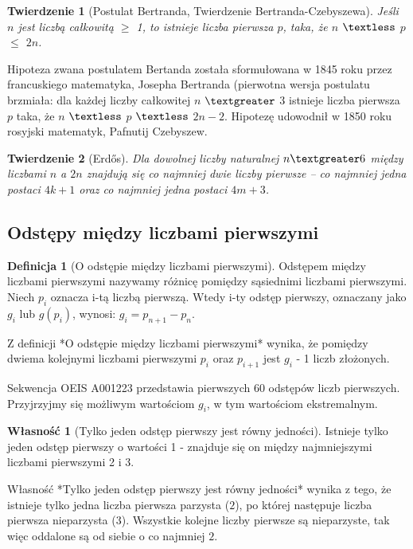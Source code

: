 \documentclass[10pt,onecolumn]{article}
\newtheorem{theorem}{Twierdzenie}
\theoremstyle{definition}
\newtheorem{definition}{Definicja}
\theoremstyle{hypothesis}
\theoremstyle{capability}
\newtheorem{capability}{Własność}
\begin{document}
\begin{theorem}[Postulat Bertranda, Twierdzenie Bertranda-Czebyszewa]
Jeśli $n$ jest liczbą całkowitą $\geq$ 1, to istnieje liczba pierwsza $p$, taka, że $n$ $\textless$ $p$ $\leq$ $2n$.
\end{theorem}

Hipoteza zwana postulatem Bertanda została sformułowana w 1845 roku przez francuskiego matematyka, Josepha Bertranda (pierwotna wersja postulatu brzmiała:  dla każdej liczby całkowitej $n$ $\textgreater$ $3$ istnieje liczba pierwsza $p$ taka, że $n$ $\textless$ $p$ $\textless$ $2n-2$. Hipotezę udowodnił w 1850 roku rosyjski matematyk, Pafnutij Czebyszew.

\begin{theorem}[Erdős]
Dla dowolnej liczby naturalnej $n \textgreater 6$  między liczbami $n$ a $2n$ znajdują się co najmniej dwie liczby pierwsze – co najmniej jedna postaci $4k+1$ oraz co najmniej jedna postaci $4m+3$. 
\end{theorem}

\subsection{Odstępy między liczbami pierwszymi}

\begin{definition} [O odstępie między liczbami pierwszymi]
Odstępem między liczbami pierwszymi nazywamy różnicę pomiędzy sąsiednimi liczbami pierwszymi. Niech $p_i$ oznacza i-tą liczbą pierwszą. Wtedy i-ty odstęp pierwszy, oznaczany jako $g_i$ lub $g(p_i)$, wynosi: $g_i = p_{n+1} - p_n$.
\end{definition}

Z definicji *O odstępie między liczbami pierwszymi* wynika, że pomiędzy dwiema kolejnymi liczbami pierwszymi $p_i$ oraz $p_{i+1}$ jest $g_i$ - 1 liczb złożonych. \par

Sekwencja OEIS A001223 przedstawia pierwszych 60 odstępów liczb pierwszych. Przyjrzyjmy się możliwym wartościom $g_i$, w tym wartościom ekstremalnym.

\begin{capability}[Tylko jeden odstęp pierwszy jest równy jedności]
Istnieje tylko jeden odstęp pierwszy o wartości 1 - znajduje się on między najmniejszymi liczbami pierwszymi 2 i 3.
\end{capability}

Własność *Tylko jeden odstęp pierwszy jest równy jedności* wynika z tego, że istnieje tylko jedna liczba pierwsza parzysta ($2$), po której następuje liczba pierwsza nieparzysta ($3$). Wszystkie kolejne liczby pierwsze są nieparzyste, tak więc oddalone są od siebie o co najmniej $2$.
\end{document}
